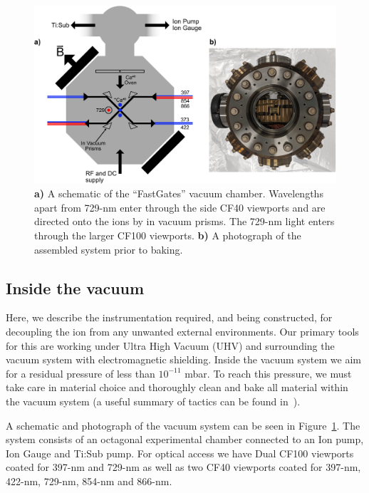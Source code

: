 \documentclass[12pt]{iopart}
\begin{document}
\begin{figure}[b]
  \begin{center}
   \noindent\includegraphics[width=0.9\linewidth]{figures/vacuum_can-crop.pdf}
  \end{center}
  \caption{
    \textbf{a)} A schematic of the ``FastGates'' vacuum
    chamber. Wavelengths apart from 729-nm enter through the side CF40
    viewports and are directed onto the ions by in vacuum prisms. The
    729-nm light enters through the larger CF100 viewports.
    \textbf{b)} A photograph of the assembled system prior to baking.
  }
  \label{fig:can}
\end{figure}

\subsection{Inside the vacuum}

Here, we describe the instrumentation required, and being constructed,
for decoupling the ion from any unwanted external environments. Our
primary tools for this are working under Ultra High Vacuum (UHV) and
surrounding the vacuum system with electromagnetic shielding. Inside
the vacuum system we aim for a residual pressure of less than
$10^{-11}$ mbar. To reach this pressure, we must take care in material
choice and thoroughly clean and bake all material within the vacuum
system (a useful summary of tactics can be found in~\cite{birnbaum_ultra-high_2005, wolf_cryogenic_2019}).

A schematic and photograph of the vacuum system can be seen in
Figure~\ref{fig:can}. The system consists of an octagonal experimental
chamber connected to an Ion pump, Ion Gauge and Ti:Sub pump. For
optical access we have Dual CF100 viewports coated for 397-nm and
729-nm as well as two CF40 viewports coated for 397-nm, 422-nm,
729-nm, 854-nm and 866-nm.
\end{document}
